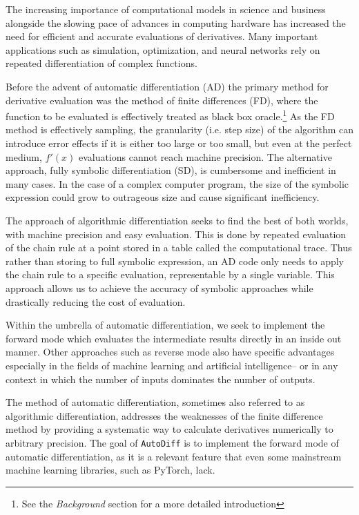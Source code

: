 The increasing importance of computational models in science and business alongside the slowing pace of advances in computing hardware has increased the need for efficient and accurate evaluations of derivatives. Many important applications such as simulation, optimization, and neural networks rely on repeated differentiation of complex functions. 

Before the advent of automatic differentiation (AD) the primary method for derivative evaluation was the method of finite differences (FD), where the function to be evaluated is effectively treated as black box oracle.\footnote{See the \emph{Background} section for a more detailed introduction} As the FD method is effectively sampling, the granularity (i.e. step size) of the algorithm can introduce error effects if it is either too large or too small, but even at the perfect medium, $f'(x)$ evaluations cannot reach machine precision. The alternative approach, fully symbolic differentiation (SD), is cumbersome and inefficient in many cases. In the case of a complex computer program, the size of the symbolic expression could grow to outrageous size and cause significant inefficiency.  

The approach of algorithmic differentiation seeks to find the best of both worlds, with machine precision and easy evaluation. This is done by repeated evaluation of the chain rule at a point stored in a table called the computational trace. Thus rather than storing to full symbolic expression, an AD code only needs to apply the chain rule to a specific evaluation, representable by a single variable. This approach allows us to achieve the accuracy of symbolic approaches while drastically reducing the cost of evaluation. 

Within the umbrella of automatic differentiation, we seek to implement the forward mode which evaluates the intermediate results directly in an inside out manner. Other approaches such as reverse mode also have specific advantages especially in the fields of machine learning and artificial intelligence-- or in any context in which the number of inputs dominates the number of outputs.  

The method of automatic differentiation, sometimes also referred to as 
algorithmic differentiation, addresses the weaknesses of the finite 
difference method by providing a systematic way to calculate derivatives 
numerically to arbitrary precision. The goal of \texttt{AutoDiff} is to 
implement the forward mode of automatic differentiation, as it is a relevant
feature that even some mainstream machine learning libraries, such as 
PyTorch, lack. 

